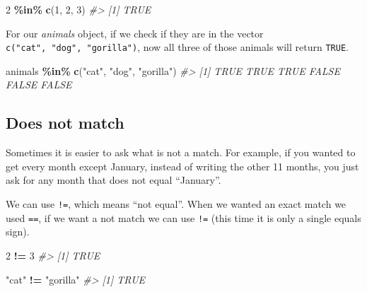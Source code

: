 \documentclass[
  12pt,
]{book}
\newenvironment{Shaded}{\begin{snugshade}}{\end{snugshade}}
\newcommand{\CommentTok}[1]{\textcolor[rgb]{0.56,0.35,0.01}{\textit{#1}}}
\newcommand{\DecValTok}[1]{\textcolor[rgb]{0.00,0.00,0.81}{#1}}
\newcommand{\KeywordTok}[1]{\textcolor[rgb]{0.13,0.29,0.53}{\textbf{#1}}}
\newcommand{\NormalTok}[1]{#1}
\newcommand{\OperatorTok}[1]{\textcolor[rgb]{0.81,0.36,0.00}{\textbf{#1}}}
\newcommand{\StringTok}[1]{\textcolor[rgb]{0.31,0.60,0.02}{#1}}
\begin{document}
\begin{Shaded}
\begin{Highlighting}[]
\DecValTok{2} \OperatorTok{\%in\%}\StringTok{ }\KeywordTok{c}\NormalTok{(}\DecValTok{1}\NormalTok{, }\DecValTok{2}\NormalTok{, }\DecValTok{3}\NormalTok{) }
\CommentTok{\#> [1] TRUE}
\end{Highlighting}
\end{Shaded}

For our \emph{animals} object, if we check if they are in the vector \texttt{c("cat",\ "dog",\ "gorilla")}, now all three of those animals will return \texttt{TRUE}.

\begin{Shaded}
\begin{Highlighting}[]
\NormalTok{animals }\OperatorTok{\%in\%}\StringTok{ }\KeywordTok{c}\NormalTok{(}\StringTok{"cat"}\NormalTok{, }\StringTok{"dog"}\NormalTok{, }\StringTok{"gorilla"}\NormalTok{)}
\CommentTok{\#> [1]  TRUE  TRUE  TRUE FALSE FALSE FALSE}
\end{Highlighting}
\end{Shaded}

\hypertarget{does-not-match}{%
\subsection{Does not match}\label{does-not-match}}

Sometimes it is easier to ask what is not a match. For example, if you wanted to get every month except January, instead of writing the other 11 months, you just ask for any month that does not equal ``January''.

We can use \texttt{!=}, which means ``not equal''. When we wanted an exact match we used \texttt{==}, if we want a not match we can use \texttt{!=} (this time it is only a single equals sign).

\begin{Shaded}
\begin{Highlighting}[]
\DecValTok{2} \OperatorTok{!=}\StringTok{ }\DecValTok{3}
\CommentTok{\#> [1] TRUE}
\end{Highlighting}
\end{Shaded}

\begin{Shaded}
\begin{Highlighting}[]
\StringTok{"cat"} \OperatorTok{!=}\StringTok{ "gorilla"}
\CommentTok{\#> [1] TRUE}
\end{Highlighting}
\end{Shaded}
\end{document}

